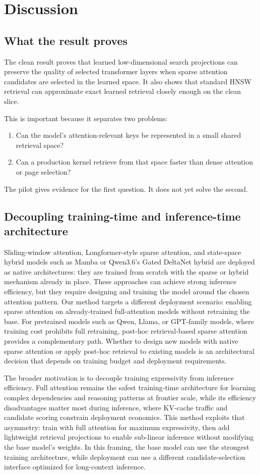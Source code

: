 \documentclass[10pt]{article}
\begin{document}
\section{Discussion}
\subsection{What the result proves}
The clean result proves that learned low-dimensional search projections can
preserve the quality of selected transformer layers when sparse attention
candidates are selected in the learned space. It also shows that standard HNSW
retrieval can approximate exact learned retrieval closely enough on the clean
slice.

This is important because it separates two problems:
\begin{enumerate}
    \item Can the model's attention-relevant keys be represented in a small
    shared retrieval space?
    \item Can a production kernel retrieve from that space faster than dense
    attention or page selection?
\end{enumerate}
The pilot gives evidence for the first question. It does not yet solve the
second.

\subsection{Decoupling training-time and inference-time architecture}
Sliding-window attention, Longformer-style sparse attention, and state-space
hybrid models such as Mamba or Qwen3.6's Gated DeltaNet hybrid are deployed as
native architectures: they are trained from scratch with the sparse or hybrid
mechanism already in place. These approaches can achieve strong inference
efficiency, but they require designing and training the model around the chosen
attention pattern. Our method targets a different deployment scenario: enabling
sparse attention on already-trained full-attention models without retraining the
base. For pretrained models such as Qwen, Llama, or GPT-family models, where
training cost prohibits full retraining, post-hoc retrieval-based sparse
attention provides a complementary path. Whether to design new models with
native sparse attention or apply post-hoc retrieval to existing models is an
architectural decision that depends on training budget and deployment
requirements.

The broader motivation is to decouple training expressivity from inference
efficiency. Full attention remains the safest training-time architecture for
learning complex dependencies and reasoning patterns at frontier scale, while
its efficiency disadvantages matter most during inference, where KV-cache
traffic and candidate scoring constrain deployment economics. This method
exploits that asymmetry: train with full attention for maximum expressivity,
then add lightweight retrieval projections to enable sub-linear inference
without modifying the base model's weights. In this framing, the base model can
use the strongest training architecture, while deployment can use a different
candidate-selection interface optimized for long-context inference.
\end{document}
